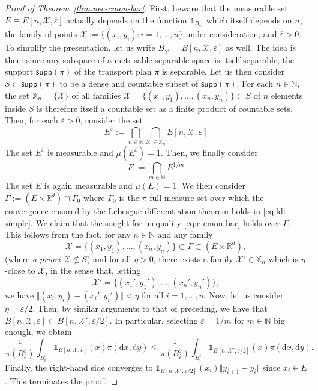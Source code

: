\documentclass[10pt,a4paper]{amsart}
\newcommand{\N}{\mathbb{N}}
\newcommand{\R}{\mathbb{R}}
\newcommand{\dd}{\mathrm{d}}
\newcommand{\eps}{\varepsilon}
\newcommand{\supp}{\textsf{supp}}
\begin{document}
\begin{proof}[Proof of Theorem~\ref{thm:nec-cmon-bar}]
     First, beware that the measurable set $E \equiv E[n, \mathcal{X}, \overline{\eps}]$ actually depends on the function $\mathds{1}_{B_{\gamma^{\overline{\eps}}}}$ which itself depends on $n$, the family of points $\mathcal{X} := \{(x_i, y_i) : i = 1, \dots, n\}$ under consideration, and $\overline{\eps} > 0$. To simplify the presentation, let us write $B_{\gamma^{\overline{\eps}}} = B[n, \mathcal{X}, \overline{\eps}]$ as well. The idea is then: since any subspace of a metrisable separable space is itself separable, the support $\supp(\pi)$ of the transport plan $\pi$  is separable. Let us then consider $S \subset \supp(\pi)$ to be a dense and countable subset of $\supp(\pi)$. For each $n \in \N$, the set $\mathbb{X}_n = \{\mathcal{X}\}$ of all families $\mathcal{X} = \{(x_1, y_1), \dots, (x_n, y_n) \} \subset S$ of $n$ elements inside $S$ is therefore itself a countable set as a finite product of countable sets. Then, for each $\overline{\eps} > 0$, consider the set 
$$
E^{\overline{\eps}} := \bigcap_{n \in \N} \bigcap_{\mathcal{X} \in \mathbb{X}_n} E[n, \mathcal{X}, \overline{\eps}]
$$
The set $E^{\overline{\eps}}$ is measurable and $\mu(E^{\overline{\eps}}) = 1$. Then, we finally consider 
$$
E := \bigcap_{m \in \N} E^{1/m}
$$ 
The set $E$ is again measurable and $\mu(E) = 1$. We then consider $\Gamma := (E \times \R^d)\cap \Gamma_0$ where $\Gamma_0$ is the $\pi$-full measure set over which the convergence ensured by the Lebesgue differentiation theorem holds in \eqref{eq:ldt-simple}. We claim that the sought-for inequality \eqref{eq:c-cmon-bar} holds over $\Gamma$. This follows from the fact, for any $n \in \N$ and any family 
$$
\mathcal{X} = \{(x_1, y_1), \dots, (x_n, y_n) \} \subset \Gamma \subset (E \times \R^d),$$
(where \textit{a priori} $\mathcal{X} \not\subset S$) and for all $\eta > 0$, there exists a family $\mathcal{X}' \in \mathbb{X}_n$ which is $\eta$-close to $\mathcal{X}$, in the sense that, letting
$$
\mathcal{X}' = \{(x_1', y_1'), \dots, (x_n', y_n') \},
$$ 
we have $\Vert (x_i, y_i) - (x_i', y_i')\Vert < \eta$ for all $i = 1, \dots, n$. Now, let us consider $\eta = \eps/2$. Then, by similar arguments to that of preceding, we have that $B[n, \mathcal{X}, \eps] \subset B[n, \mathcal{X}', \eps/2]$. In particular, selecting $\overline{\eps} = 1/m$ for $m \in \N$ big enough, we obtain
 \begin{equation}
\frac1{\pi(B_i^\eps)} \int_{B_i^\eps} \mathds{1}_{B[n, \mathcal{X}, \overline{\eps}]}(x) \pi(\dd x, \dd y) \leq \frac1{\pi(B_i^\eps)} \int_{B_i^\eps} \mathds{1}_{B[n, \mathcal{X}', \overline{\eps}/2]}(x) \pi(\dd x, \dd y).
\end{equation}
Finally, the right-hand side converges to $\mathds{1}_{B[n, \mathcal{X}', \overline{\eps}/2]}(x_i) \Vert y_{i+1} - y_i\Vert$ since $x_i \in E$. This terminates the proof.

     
   
	\end{proof}
\end{document}
